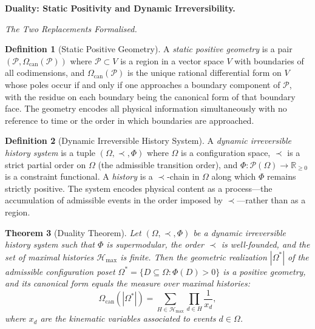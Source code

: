\documentclass[12pt, oneside]{amsart}
\theoremstyle{plain}
\newtheorem{theorem}{Theorem}[section]
\theoremstyle{definition}
\newtheorem{definition}[theorem]{Definition}
\theoremstyle{remark}
\newcommand{\R}{\mathbb{R}}
\newcommand{\Phif}{\Phi}
\newcommand{\OmKS}{\Omega}
\newcommand{\CF}{\Omega_{\mathrm{can}}}
\newcommand{\Hmax}{\mathcal{H}_{\max}}
\begin{document}
\bigskip\noindent\textbf{Duality: Static Positivity and Dynamic Irreversibility.}
\label{sec:duality}

\medskip\noindent\textit{The Two Replacements Formalised.}

\begin{definition}[Static Positive Geometry]
A \emph{static positive geometry} is a pair $(\mathcal{P}, \CF(\mathcal{P}))$ where $\mathcal{P} \subset V$ is a region in a vector space $V$ with boundaries of all codimensions, and $\CF(\mathcal{P})$ is the unique rational differential form on $V$ whose poles occur if and only if one approaches a boundary component of $\mathcal{P}$, with the residue on each boundary being the canonical form of that boundary face. The geometry encodes all physical information simultaneously with no reference to time or the order in which boundaries are approached.
\end{definition}

\begin{definition}[Dynamic Irreversible History System]
A \emph{dynamic irreversible history system} is a tuple $(\OmKS, \prec, \Phif)$ where $\OmKS$ is a configuration space, $\prec$ is a strict partial order on $\OmKS$ (the admissible transition order), and $\Phif: \mathcal{P}(\OmKS) \to \R_{\geq 0}$ is a constraint functional. A \emph{history} is a $\prec$-chain in $\OmKS$ along which $\Phif$ remains strictly positive. The system encodes physical content as a process---the accumulation of admissible events in the order imposed by $\prec$---rather than as a region.
\end{definition}

\begin{theorem}[Duality Theorem]
\label{thm:duality}
Let $(\OmKS, \prec, \Phif)$ be a dynamic irreversible history system such that $\Phif$ is supermodular, the order $\prec$ is well-founded, and the set of maximal histories $\Hmax$ is finite. Then the geometric realization $|\OmKS^*|$ of the admissible configuration poset $\OmKS^* = \{D \subseteq \OmKS : \Phif(D) > 0\}$ is a positive geometry, and its canonical form equals the measure over maximal histories:
\[
  \CF(|\OmKS^*|) = \sum_{H \in \Hmax} \prod_{d \in H} \frac{1}{x_d},
\]
where $x_d$ are the kinematic variables associated to events $d \in \OmKS$.
\end{theorem}
\end{document}
